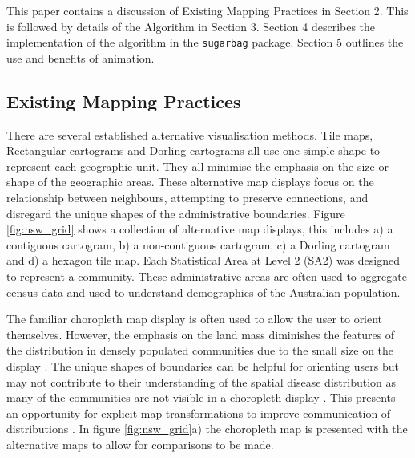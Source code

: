 This paper contains a discussion of Existing Mapping Practices in
Section 2. This is followed by details of the Algorithm in Section 3.
Section 4 describes the implementation of the algorithm in the
\texttt{sugarbag} package. Section 5 outlines the use and benefits of
animation.

\hypertarget{existing-mapping-practices}{%
\subsection{Existing Mapping
Practices}\label{existing-mapping-practices}}

There are several established alternative visualisation methods. Tile
maps, Rectangular cartograms \citep{ORC} and Dorling cartograms
\citep{ACTUC} all use one simple shape to represent each geographic
unit. They all minimise the emphasis on the size or shape of the
geographic areas. These alternative map displays focus on the
relationship between neighbours, attempting to preserve connections, and
disregard the unique shapes of the administrative boundaries. Figure
\ref{fig:nsw_grid} shows a collection of alternative map displays, this
includes a) a contiguous cartogram, b) a non-contiguous cartogram, c) a
Dorling cartogram and d) a hexagon tile map. Each Statistical Area at
Level 2 (SA2) \citep{abs2011} was designed to represent a community.
These administrative areas are often used to aggregate census data and
used to understand demographics of the Australian population.

The familiar choropleth map display is often used to allow the user to
orient themselves. However, the emphasis on the land mass diminishes the
features of the distribution in densely populated communities due to the
small size on the display \citep{ACTUC}. The unique shapes of boundaries
can be helpful for orienting users but may not contribute to their
understanding of the spatial disease distribution as many of the
communities are not visible in a choropleth display \citep{TVSSS}. This
presents an opportunity for explicit map transformations to improve
communication of distributions \citep{CBATCC}. In figure
\ref{fig:nsw_grid}a) the choropleth map is presented with the
alternative maps to allow for comparisons to be made.

